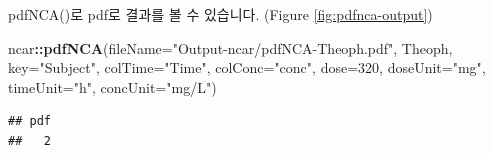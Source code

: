 \documentclass[9pt,]{krantz}
\newenvironment{Shaded}{\begin{snugshade}}{\end{snugshade}}
\newcommand{\DataTypeTok}[1]{\textcolor[rgb]{0.13,0.29,0.53}{#1}}
\newcommand{\DecValTok}[1]{\textcolor[rgb]{0.00,0.00,0.81}{#1}}
\newcommand{\KeywordTok}[1]{\textcolor[rgb]{0.13,0.29,0.53}{\textbf{#1}}}
\newcommand{\NormalTok}[1]{#1}
\newcommand{\OperatorTok}[1]{\textcolor[rgb]{0.81,0.36,0.00}{\textbf{#1}}}
\newcommand{\StringTok}[1]{\textcolor[rgb]{0.31,0.60,0.02}{#1}}
\begin{document}
pdfNCA()로 pdf로 결과를 볼 수 있습니다. (Figure \ref{fig:pdfnca-output})

\begin{Shaded}
\begin{Highlighting}[]
\NormalTok{ncar}\OperatorTok{::}\KeywordTok{pdfNCA}\NormalTok{(}\DataTypeTok{fileName=}\StringTok{"Output-ncar/pdfNCA-Theoph.pdf"}\NormalTok{, Theoph, }\DataTypeTok{key=}\StringTok{"Subject"}\NormalTok{, }
             \DataTypeTok{colTime=}\StringTok{"Time"}\NormalTok{,  }\DataTypeTok{colConc=}\StringTok{"conc"}\NormalTok{, }\DataTypeTok{dose=}\DecValTok{320}\NormalTok{, }\DataTypeTok{doseUnit=}\StringTok{"mg"}\NormalTok{, }
             \DataTypeTok{timeUnit=}\StringTok{"h"}\NormalTok{, }\DataTypeTok{concUnit=}\StringTok{"mg/L"}\NormalTok{)}
\end{Highlighting}
\end{Shaded}

\begin{verbatim}
## pdf 
##   2
\end{verbatim}
\end{document}
